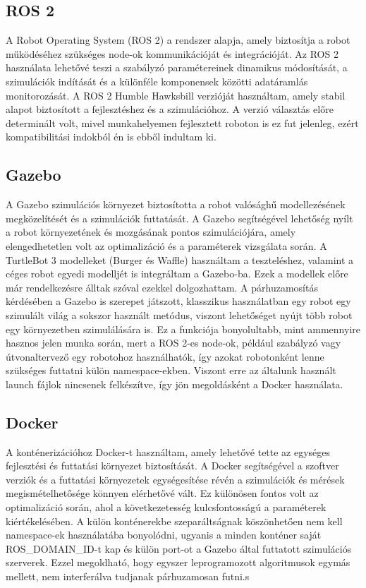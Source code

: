 \subsection{ROS 2}
A Robot Operating System (ROS 2) a rendszer alapja, amely biztosítja a robot működéséhez szükséges node-ok kommunikációját és integrációját. Az ROS 2 használata lehetővé teszi a szabályzó paramétereinek dinamikus módosítását, a szimulációk indítását és a különféle komponensek közötti adatáramlás monitorozását. A ROS 2 Humble Hawksbill verzióját használtam, amely stabil alapot biztosított a fejlesztéshez és a szimulációhoz. A verzió választás előre determinált volt, mivel munkahelyemen fejlesztett roboton is ez fut jelenleg, ezért kompatibilitási indokból én is ebből indultam ki.

\subsection{Gazebo}
A Gazebo szimulációs környezet biztosította a robot valósághű modellezésének megközelítését és a szimulációk futtatását. A Gazebo segítségével lehetőség nyílt a robot környezetének és mozgásának pontos szimulációjára, amely elengedhetetlen volt az optimalizáció és a paraméterek vizsgálata során. A TurtleBot 3 modelleket (Burger és Waffle) használtam a teszteléshez, valamint a céges robot egyedi modelljét is integráltam a Gazebo-ba. Ezek a modellek előre már rendelkezésre álltak szóval ezekkel dolgozhattam. A párhuzamosítás kérdésében a Gazebo is szerepet játszott, klasszikus használatban egy robot egy szimulált világ a sokszor használt metódus, viszont lehetőséget nyújt több robot egy környezetben szimulálására is. Ez a funkciója bonyolultabb, mint ammennyire hasznos jelen munka során, mert a ROS 2-es node-ok, például szabályzó vagy útvonaltervező egy robotohoz használhatók, így azokat robotonként lenne szükséges futtatni külön namespace-ekben. Viszont erre az általunk használt launch fájlok nincsenek felkészítve, így jön megoldásként a Docker használata.

\subsection{Docker}
A konténerizációhoz Docker-t használtam, amely lehetővé tette az egységes fejlesztési és futtatási környezet biztosítását. A Docker segítségével a szoftver verziók és a futtatási környezetek egységesítése révén a szimulációk és mérések megismételhetősége könnyen elérhetővé vált. Ez különösen fontos volt az optimalizáció során, ahol a következetesség kulcsfontosságú a paraméterek kiértékelésében. A külön konténerekbe szeparáltságnak köszönhetően nem kell namespace-ek használatába bonyolódni, ugyanis a minden konténer saját ROS\_DOMAIN\_ID-t kap és külön port-ot a Gazebo által futtatott szimulációs szerverek. Ezzel megoldható, hogy egyszer leprogramozott algoritmusok egymás mellett, nem interferálva tudjanak párhuzamosan futni.s

